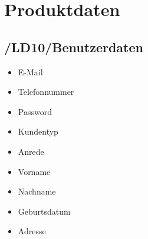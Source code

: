 
\section{Produktdaten}
\subsection*{/LD10/Benutzerdaten}
\begin{itemize}
	\item E-Mail
    \item Telefonnummer
    \item Password
    \item Kundentyp
    \item Anrede
    \item Vorname
    \item Nachname
    \item Geburtsdatum
    \item Adresse
\end{itemize}